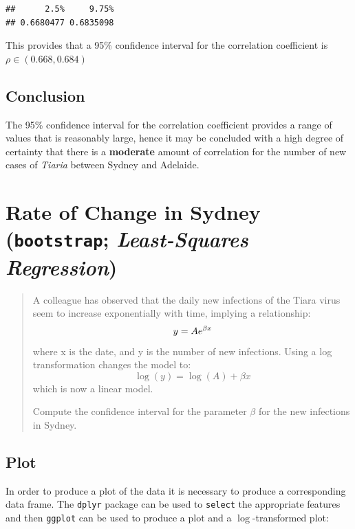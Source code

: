 \documentclass{article}
\newcommand{\passthrough}[1]{#1}
\begin{document}
\begin{lstlisting}
##      2.5%     9.75% 
## 0.6680477 0.6835098
\end{lstlisting}

This provides that a 95\% confidence interval for the correlation
coefficient is \(\rho \in \left(0.668, 0.684\right)\)

\hypertarget{conclusion-2}{%
\subsection{Conclusion}\label{conclusion-2}}

The 95\% confidence interval for the correlation coefficient provides a
range of values that is reasonably large, hence it may be concluded with
a high degree of certainty that there is a \textbf{moderate} amount of
correlation for the number of new cases of \emph{Tiaria} between Sydney
and Adelaide.

\hypertarget{question-4}{%
\section{Rate of Change in Sydney \qquad \normalsize(\texttt{bootstrap}; \textit{Least-Squares Regression})}\label{question-4}}

\begin{quote}
A colleague has observed that the daily new infections of the Tiara
virus seem to increase exponentially with time, implying a relationship:
\[
y = Ae^{\beta x} \\
\] where x is the date, and y is the number of new infections. Using a
log transformation changes the model to: \[
\log{\left(y\right)} = \log{\left(A\right)} + \beta x
\] which is now a linear model.

Compute the confidence interval for the parameter \(\beta\) for the new
infections in Sydney.
\end{quote}

\hypertarget{plot-3}{%
\subsection{Plot}\label{plot-3}}

In order to produce a plot of the data it is necessary to produce a
corresponding data frame. The \passthrough{\lstinline!dplyr!} package
can be used to \passthrough{\lstinline!select!} the appropriate features
and then \passthrough{\lstinline!ggplot!} can be used to produce a plot
and a \(\log\)-transformed plot:
\end{document}
